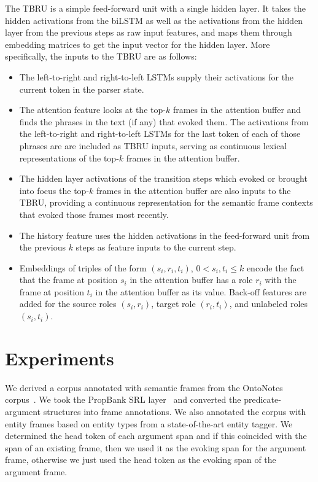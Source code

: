 \documentclass[11pt,a4paper]{article}
\begin{document}
The TBRU is a simple feed-forward unit with a single hidden layer.
It takes the hidden activations from the biLSTM as well as the activations from
the hidden layer from the previous steps as raw input features, and maps them
through embedding matrices to get the input vector for the  hidden layer. More specifically,
the inputs to the TBRU are as follows:

\begin{itemize}
  \item The left-to-right and right-to-left LSTMs supply their activations
  for the current token in the parser state.
  \item The attention feature looks at the top-$k$ frames in the attention buffer
  and finds the phrases in the text (if any) that evoked them. The activations
  from the left-to-right and right-to-left LSTMs for the last token of each of those
  phrases are are included as TBRU inputs, serving as continuous lexical
  representations of the top-$k$ frames in the attention buffer.
  \item The hidden layer activations of the transition steps which evoked or
  brought into focus the top-$k$ frames in the attention buffer are also inputs to the TBRU,
  providing a
  continuous representation for the semantic frame contexts that evoked those frames most recently.
  \item The history feature uses the hidden activations in the feed-forward
  unit from the previous $k$ steps as feature inputs to the current step.
  \item Embeddings of triples of the form $(s_i, r_i, t_i)$, $0<s_i,t_i\le k$ encode the fact that the frame at position $s_i$ in the attention buffer has a role $r_i$ with
  the frame at position $t_i$ in the attention buffer as its value. Back-off
  features are added for the source roles $(s_i,r_i)$, target role $(r_i, t_i)$,
  and unlabeled roles $(s_i,t_i)$.
\end{itemize}

\section{Experiments}
\label{sec:experiments}

We derived a corpus annotated with semantic frames from the OntoNotes corpus~\cite{ontonotes2006}. We took the
PropBank SRL layer~\cite{palmer2005} and converted the predicate-argument
structures into frame annotations. We also annotated the corpus with
entity frames based on entity types from a state-of-the-art entity tagger.
We determined the head token of each argument span and if this coincided
with the span of an existing frame, then we used it as the evoking span for the
argument frame, otherwise we just used the head token as the evoking span of the
argument frame.
\end{document}
